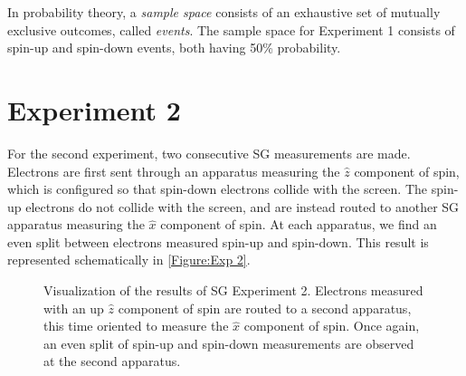 In probability theory, a \textit{sample space} consists of an exhaustive set of mutually exclusive outcomes, called \textit{events}. The sample space for Experiment 1 consists of spin-up and spin-down events, both having 50\% probability.

\section{Experiment 2}

For the second experiment, two consecutive SG measurements are made. Electrons are first sent through an apparatus measuring the $\hat{z}$ component of spin, which is configured so that spin-down electrons collide with the screen. The spin-up electrons do not collide with the screen, and are instead routed to another SG apparatus measuring the $\hat{x}$ component of spin. At each apparatus, we find an even split between electrons measured spin-up and spin-down. This result is represented schematically in \autoref{Figure:Exp 2}.

\begin{figure}
\centering\CaptionFontSize
{}

\caption[Results of Stern-Gerlach Experiment 2]
{Visualization of the results of SG Experiment 2. Electrons measured with an up $\hat{z}$ component of spin are routed to a second apparatus, this time oriented to measure the $\hat{x}$ component of spin. Once again, an even split of spin-up and spin-down measurements are observed at the second apparatus.}
\label{Figure:Exp 2}
\end{figure}

